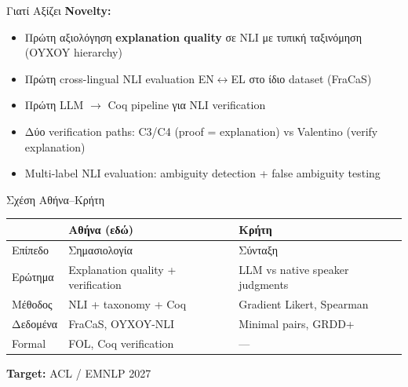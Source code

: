 \documentclass[aspectratio=169,10pt]{beamer}
\begin{document}
\begin{frame}{Γιατί Αξίζει}
	\textbf{Novelty:}
	\begin{itemize}
		\item Πρώτη αξιολόγηση \textbf{explanation quality} σε NLI με τυπική ταξινόμηση (OYXOY hierarchy)
		\item Πρώτη cross-lingual NLI evaluation EN$\leftrightarrow$EL στο ίδιο dataset (FraCaS)
		\item Πρώτη LLM $\to$ Coq pipeline για NLI verification
		\item Δύο verification paths: C3/C4 (proof = explanation) vs Valentino (verify explanation)
		\item Multi-label NLI evaluation: ambiguity detection + false ambiguity testing
	\end{itemize}

	\vspace{0.3cm}
	\begin{block}{Σχέση Αθήνα--Κρήτη}
		\begin{center}
		\small
		\begin{tabular}{lll}
			\toprule
			& \textbf{Αθήνα (εδώ)} & \textbf{Κρήτη} \\
			\midrule
			Επίπεδο & Σημασιολογία & Σύνταξη \\
			Ερώτημα & Explanation quality + verification & LLM vs native speaker judgments \\
			Μέθοδος & NLI + taxonomy + Coq & Gradient Likert, Spearman \\
			Δεδομένα & FraCaS, OYXOY-NLI & Minimal pairs, GRDD+ \\
			Formal & FOL, Coq verification & --- \\
			\bottomrule
		\end{tabular}
		\end{center}
	\end{block}

	\vspace{0.2cm}
	\textbf{Target:} ACL / EMNLP 2027
\end{frame}
\end{document}
